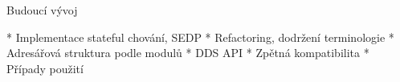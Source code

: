 \sec Budoucí vývoj

* Implementace stateful chování, SEDP
* Refactoring, dodržení terminologie
* Adresářová struktura podle modulů
* DDS API
* Zpětná kompatibilita
* Případy použití

